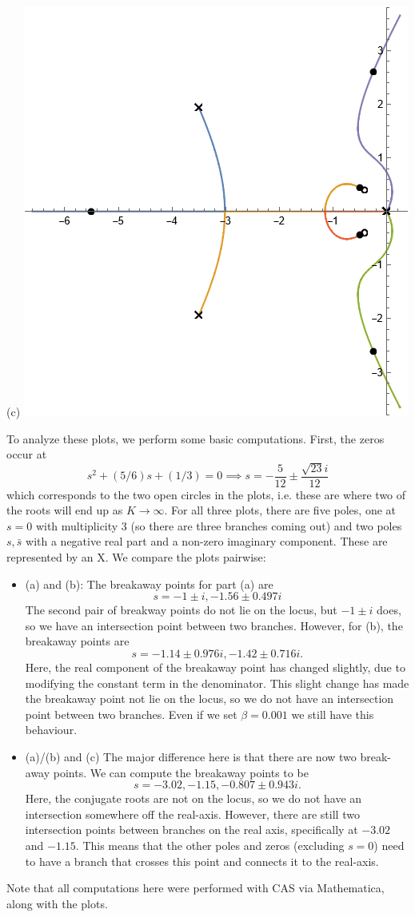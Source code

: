 \documentclass{article}
\begin{document}
\begin{enumerate}[label=\textbf{3.\arabic*}]
\begin{center}
    \vspace{2mm}
    (c)
    \includegraphics[width=0.4\linewidth]{A3_imgs/q3c.png}
\end{center}
To analyze these plots, we perform some basic computations. First, the zeros occur at 
\begin{equation}
    s^2+(5/6)s+(1/3)=0 \implies  s = - \frac{5}{12} \pm \frac{\sqrt{23} i}{12}
\end{equation}
which corresponds to the two open circles in the plots, i.e. these are where two of the roots will end up as $K\to \infty.$ For all three plots, there are five poles, one at $s=0$ with multiplicity $3$ (so there are three branches coming out) and two poles $s,\bar{s}$ with a negative real part and a non-zero imaginary component. These are represented by an X. We compare the plots pairwise:
\begin{itemize}
    \item (a) and (b): The breakaway points for part (a) are 
    \begin{equation}
        s = -1 \pm i, -1.56 \pm 0.497i
    \end{equation}
    The second pair of breakway points do not lie on the locus, but $-1 \pm i$ does, so we have an intersection point between two branches. However, for (b), the breakaway points are 
    \begin{equation}
        s = -1.14 \pm 0.976i, -1.42 \pm 0.716i.
    \end{equation}
    Here, the real component of the breakaway point has changed slightly, due to modifying the constant term in the denominator. This slight change has made the breakaway point not lie on the locus, so we do not have an intersection point between two branches. Even if we set $\beta = 0.001$ we still have this behaviour.
    \item (a)/(b) and (c)
    The major difference here is that there are now two break-away points. We can compute the breakaway points to be
    \begin{equation}
        s=-3.02, -1.15, -0.807 \pm 0.943 i.
    \end{equation}
    Here, the conjugate roots are not on the locus, so we do not have an intersection somewhere off the real-axis. However, there are still two intersection points between branches on the real axis, specifically at $-3.02$ and $-1.15.$ This means that the other poles and zeros (excluding $s=0$) need to have a branch that crosses this point and connects it to the real-axis.
\end{itemize}
Note that all computations here were performed with CAS via Mathematica, along with the plots.


\end{enumerate}
\end{document}
